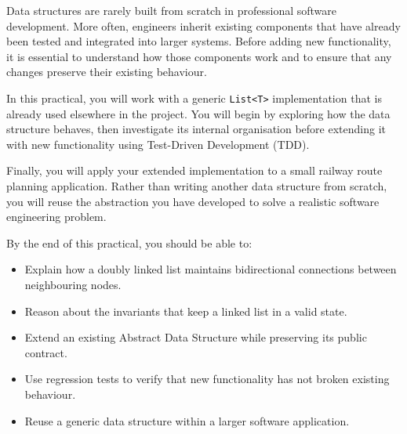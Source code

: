 \documentclass{csc2059practical}
\begin{document}
\maketitle

\tableofcontents
\clearpage



Data structures are rarely built from scratch in professional software development. More often, engineers inherit existing components that have already been tested and integrated into larger systems. Before adding new functionality, it is essential to understand how those components work and to ensure that any changes preserve their existing behaviour.

In this practical, you will work with a generic \texttt{List<T>} implementation that is already used elsewhere in the project. You will begin by exploring how the data structure behaves, then investigate its internal organisation before extending it with new functionality using Test-Driven Development (TDD).

Finally, you will apply your extended implementation to a small railway route planning application. Rather than writing another data structure from scratch, you will reuse the abstraction you have developed to solve a realistic software engineering problem.

\begin{learningoutcomes}
By the end of this practical, you should be able to:

\begin{itemize}
    \item Explain how a doubly linked list maintains bidirectional connections between neighbouring nodes.
    \item Reason about the invariants that keep a linked list in a valid state.
    \item Extend an existing Abstract Data Structure while preserving its public contract.
    \item Use regression tests to verify that new functionality has not broken existing behaviour.
    \item Reuse a generic data structure within a larger software application.
\end{itemize}
\end{learningoutcomes}
\end{document}
